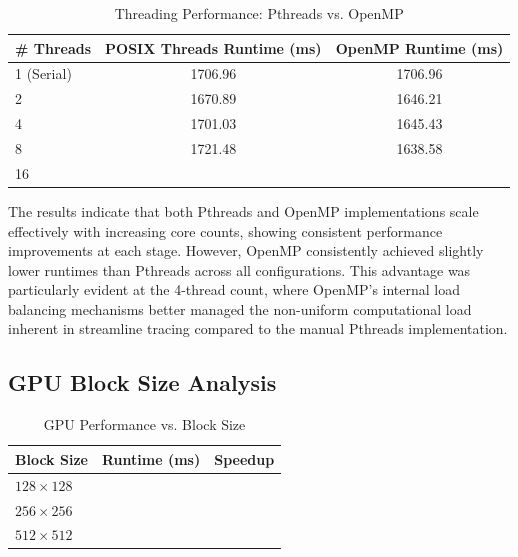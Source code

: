 \begin{table}[htbp]
	\centering
	\caption{Threading Performance: Pthreads vs. OpenMP}
	\label{tab:threading_comparison}
	\begin{tabular}{|l|c|c|}
		\hline
		\textbf{\# Threads} & \textbf{POSIX Threads Runtime (ms)} & \textbf{OpenMP Runtime (ms)} \\ \hline
		1 (Serial)          & 1706.96                             & 1706.96                      \\ \hline
		2                   & 1670.89                             & 1646.21                      \\ \hline
		4                   & 1701.03                             & 1645.43                      \\ \hline
		8                   & 1721.48                             & 1638.58                      \\ \hline
		16                  &                                     &                              \\ \hline
	\end{tabular}
\end{table}


The results indicate that both Pthreads and OpenMP implementations scale effectively with increasing core counts, showing consistent performance improvements at each stage.
However, OpenMP consistently achieved slightly lower runtimes than Pthreads across all configurations.
This advantage was particularly evident at the 4-thread count, where OpenMP's internal load balancing mechanisms better managed the non-uniform computational load inherent in streamline tracing compared to the manual Pthreads implementation.

\subsection{GPU Block Size Analysis}

\begin{table}[htbp]
	\centering
	\caption{GPU Performance vs. Block Size}
	\label{tab:gpu_block_size}
	\begin{tabular}{|l|r|r|}
		\hline
		\textbf{Block Size} & \textbf{Runtime (ms)} & \textbf{Speedup} \\ \hline
		$128 \times 128 $   &                       &                  \\ \hline
		$256 \times 256 $   &                       &                  \\ \hline
		$512 \times 512 $   &                       &                  \\ \hline
	\end{tabular}
\end{table}

